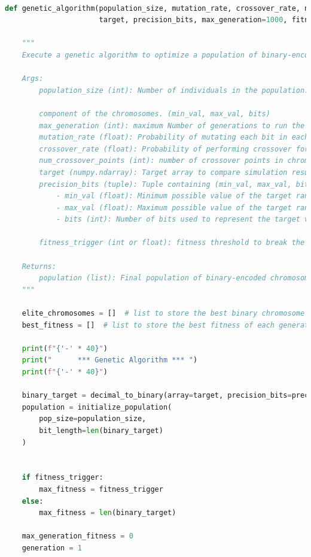 \documentclass[12pt]{article}
\begin{document}
\newpage
\begin{lstlisting}[language=Python, caption={Genetic Algorithm}, numbers=none, breaklines=true]

def genetic_algorithm(population_size, mutation_rate, crossover_rate, num_crossover_points,
                      target, precision_bits, max_generation=1000, fitness_trigger=None):

    """
    Execute a genetic algorithm to optimize a population of binary-encoded chromosomes.

    Args:
        population_size (int): Number of individuals in the population.

        component of the chromosomes. (min_val, max_val, bits)
        max_generation (int): maximum Number of generations to run the algorithm.
        mutation_rate (float): Probability of mutating each bit in each chromosome.
        crossover_rate (float): Probability of performing crossover for each chromosome.
        num_crossover_points (int): number of crossover points in chromosome.
        target (numpy.ndarray): Target array to compare simulation results against.
        precision_bits (tuple): Tuple containing (min_val, max_val, bits) for encoding the target.
            - min_val (float): Minimum possible value of the target range.
            - max_val (float): Maximum possible value of the target range.
            - bits (int): Number of bits used to represent the target values in the binary string.

        fitness_trigger (int or float): fitness threshold to break the algorithm

    Returns:
        population (list): Final population of binary-encoded chromosomes.
    """

    elite_chromosomes = []  # list to store the best binary chromosome of each generation
    best_fitness = []  # list to store the best fitness of each generation

    print(f"{'-' * 40}")
    print("      *** Genetic Algorithm *** ")
    print(f"{'-' * 40}")

    binary_target = decimal_to_binary(array=target, precision_bits=precision_bits)
    population = initialize_population(
        pop_size=population_size,
        bit_length=len(binary_target)
    )


    if fitness_trigger:
        max_fitness = fitness_trigger
    else:
        max_fitness = len(binary_target)

    max_generation_fitness = 0
    generation = 1


\end{lstlisting}
\end{document}
